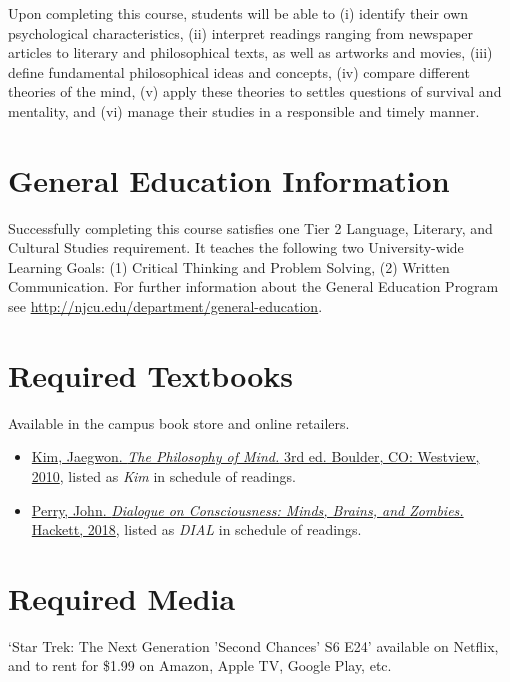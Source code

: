 \documentclass[article,oneside]{memoir}
\begin{document}
Upon completing this course, students will be able to  (i) identify their own psychological characteristics, (ii) interpret readings ranging from newspaper articles to literary and philosophical texts, as well as artworks and movies, (iii) define fundamental philosophical ideas and concepts, (iv) compare different theories of the mind, (v) apply these theories to settles questions of survival and mentality,  and  (vi) manage their studies in a responsible and timely manner. 


\section{General Education Information} 
Successfully completing this course satisfies one Tier 2 Language, Literary, and Cultural Studies requirement. It teaches the following two University-wide Learning Goals: (1) Critical Thinking and Problem Solving, (2) Written Communication. For further information about the General Education Program see \href{http://njcu.edu/department/general-education}{http://njcu.edu/department/general-education}.


\section{Required Textbooks}
Available in the campus book store and online retailers.


\begin{itemize}
\item \href{https://www.amazon.com/Philosophy-Mind-Jaegwon-Kim/dp/0813344581/ref=sr_1_1?ie=UTF8&qid=1484684648&sr=8-1&keywords=kim+philosophy+of+mind}{Kim, Jaegwon. \emph{The Philosophy of Mind.} 3rd ed. Boulder, CO: Westview, 2010}, listed as \emph{Kim} in schedule of readings.
\item \href{https://www.amazon.com/Dialogue-Consciousness-Zombies-Philosophical-Dialogues/dp/1624667368/ref=sr_1_1?ie=UTF8&qid=1545172478&sr=8-1&keywords=john+perry+consciousness}{Perry, John. \emph{Dialogue on Consciousness: Minds, Brains, and Zombies.} Hackett, 2018}, listed as \emph{DIAL} in schedule of readings.
\end{itemize}

\section{Required Media}
\item `Star Trek: The Next Generation 'Second Chances' S6 E24' available on Netflix, and to rent for \$1.99 on Amazon, Apple TV, Google Play, etc. 
\item 
\end{document}
